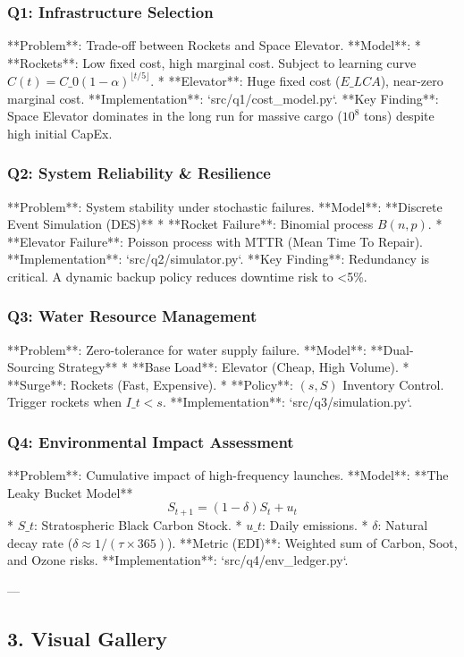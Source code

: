 \documentclass{article}
\begin{document}
\subsubsection*{Q1: Infrastructure Selection}
**Problem**: Trade-off between Rockets and Space Elevator.
**Model**:
*   **Rockets**: Low fixed cost, high marginal cost. Subject to learning curve $C(t) = C\_0 (1-\alpha)^{\lfloor t/5 \rfloor}$.
*   **Elevator**: Huge fixed cost ($E\_{LCA}$), near-zero marginal cost.
**Implementation**: `src/q1/cost\_model.py`.
**Key Finding**: Space Elevator dominates in the long run for massive cargo ($10^8$ tons) despite high initial CapEx.
\par
\subsubsection*{Q2: System Reliability & Resilience}
**Problem**: System stability under stochastic failures.
**Model**: **Discrete Event Simulation (DES)**
*   **Rocket Failure**: Binomial process $B(n, p)$.
*   **Elevator Failure**: Poisson process with MTTR (Mean Time To Repair).
**Implementation**: `src/q2/simulator.py`.
**Key Finding**: Redundancy is critical. A dynamic backup policy reduces downtime risk to <5\%.
\par
\subsubsection*{Q3: Water Resource Management}
**Problem**: Zero-tolerance for water supply failure.
**Model**: **Dual-Sourcing Strategy**
*   **Base Load**: Elevator (Cheap, High Volume).
*   **Surge**: Rockets (Fast, Expensive).
*   **Policy**: $(s, S)$ Inventory Control. Trigger rockets when $I\_t < s$.
**Implementation**: `src/q3/simulation.py`.
\par
\subsubsection*{Q4: Environmental Impact Assessment}
**Problem**: Cumulative impact of high-frequency launches.
**Model**: **The Leaky Bucket Model**
\[ S_{t+1} = (1 - \delta) S_t + u_t \]
*   $S\_t$: Stratospheric Black Carbon Stock.
*   $u\_t$: Daily emissions.
*   $\delta$: Natural decay rate ($\delta \approx 1/(\tau \times 365)$).
**Metric (EDI)**: Weighted sum of Carbon, Soot, and Ozone risks.
**Implementation**: `src/q4/env\_ledger.py`.
\par
---
\par
\subsection*{3. Visual Gallery}
\par
\end{document}
